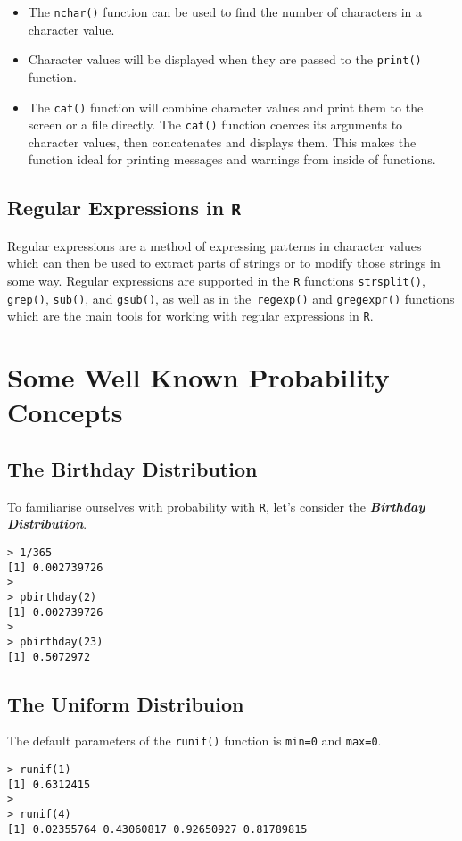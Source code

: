 \begin{itemize}
\item The \texttt{nchar()} function can be used to find the number of characters in a character value.
\item Character values will be displayed when they are passed to the  \texttt{print()} function.
\item The \texttt{cat()}  function will combine
character values and print them to the screen or a file directly. The \texttt{cat()}
function coerces its arguments to character values, then concatenates and displays
them. This makes the function ideal for printing messages and warnings
from inside of functions.
\end{itemize}

\subsection{Regular Expressions in \texttt{R}}
Regular expressions are a method of expressing patterns in character values
which can then be used to extract parts of strings or to modify those strings in some way. Regular expressions are supported in the \texttt{R} functions \texttt{strsplit()},
\texttt{grep()}, \texttt{sub()}, and \texttt{gsub()}, as well as in the\texttt{ regexp()} and \texttt{gregexpr()} functions which
are the main tools for working with regular expressions in \texttt{R}.


\newpage
\section{Some Well Known Probability Concepts}
\subsection{The Birthday Distribution}
To familiarise ourselves with probability with \texttt{R}, let's consider the \textbf{\textit{Birthday Distribution}}.

\begin{framed}
\begin{verbatim}
> 1/365
[1] 0.002739726
>
> pbirthday(2)
[1] 0.002739726
>
> pbirthday(23)
[1] 0.5072972
\end{verbatim}
\end{framed}
\subsection{The Uniform Distribuion}
The default parameters of the \texttt{runif()} function is \texttt{min=0} and \texttt{max=0}.
\begin{framed}
\begin{verbatim}
> runif(1)
[1] 0.6312415
>
> runif(4)
[1] 0.02355764 0.43060817 0.92650927 0.81789815
\end{verbatim}
\end{framed}


